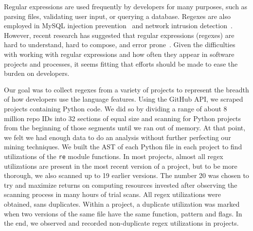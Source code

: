 Regular expressions are used frequently by developers for many purposes, such as parsing files, validating user input, or querying a database.
Regexes are also employed in MySQL injection prevention~\cite{Yeole:2011:ADT:1980022.1980229} and network intrusion detection~\cite{network}.
However, recent research has suggested that regular expressions (regexes) are hard to understand, hard to compose, and error prone~\cite{Spishak:2012:TSR:2318202.2318207}.
Given the difficulties with working with regular expressions and how often they appear in software projects and processes, it seems fitting that efforts should be made to ease the burden on developers.

Our goal was to collect regexes from a variety of projects to represent the breadth of how developers use the language features.
Using the GitHub API, we scraped  projects containing Python code.
We did so  by dividing a range of about 8 million repo IDs into 32 sections of equal size and scanning  for Python projects from the beginning of those segments until we ran out of memory. At that point, we felt we had enough data to do an analysis without further perfecting our mining techniques. We built the AST of each Python file in each project to find utilizations of the {\tt re} module functions. In most projects, almost all regex utilizations are present in the most recent version of a project, but to be more thorough, we also scanned up to 19 earlier versions. The number 20 was chosen to try and maximize returns on computing resources invested after observing the scanning process in many hours of trial scans.
All regex utilizations were obtained, sans duplicates. Within a project, a duplicate utilization was marked when two versions of the same file have the same function, pattern and flags.  In the end, we observed and recorded  non-duplicate regex utilizations in  projects.

